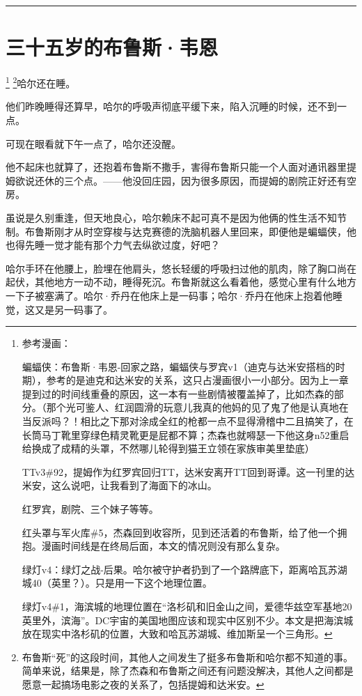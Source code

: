 \documentclass[../main]{subfiles}
\begin{document}
\begin{center}\rule{0.5\linewidth}{0.5pt}\end{center}

\section{三十五岁的布鲁斯·韦恩}

\footnote[1]{参考漫画：

    蝙蝠侠：布鲁斯·韦恩-回家之路，蝙蝠侠与罗宾v1（迪克与达米安搭档的时期），参考的是迪克和达米安的关系，这只占漫画很小一小部分。因为上一章提到过的时间线重叠的原因，这一本有一些剧情被覆盖掉了，比如杰森的部分。（那个光可鉴人、红润圆滑的玩意儿我真的他妈的见了鬼了他是认真地在当反派吗？！相比之下那对涂成全红的枪都一点不显得滑稽中二且搞笑了，在长筒马丁靴里穿绿色精灵靴更是屁都不算；杰森也就嘚瑟一下他这身n52重启给换成了成精的头罩，不然哪儿轮得到猫王立领在家族审美里垫底）

    TTv3\#92，提姆作为红罗宾回归TT，达米安离开TT回到哥谭。这一刊里的达米安，这么说吧，让我看到了海面下的冰山。

    红罗宾，剧院、三个妹子等等。

    红头罩与军火库\#5，杰森回到收容所，见到还活着的布鲁斯，给了他一个拥抱。漫画时间线是在终局后面，本文的情况则没有那么复杂。

    绿灯v4：绿灯之战-后果。哈尔被守护者扔到了一个路牌底下，距离哈瓦苏湖城40（英里？）。只是用一下这个地理位置。

    绿灯v4\#1，海滨城的地理位置在“洛杉矶和旧金山之间，爱德华兹空军基地20英里外，滨海”。DC宇宙的美国地图应该和现实中区别不少。本文是把海滨城放在现实中洛杉矶的位置，大致和哈瓦苏湖城、维加斯呈一个三角形。}
\footnote[2]{布鲁斯“死”的这段时间，其他人之间发生了挺多布鲁斯和哈尔都不知道的事。简单来说，结果是，除了杰森和布鲁斯之间还有问题没解决，其他人之间都是愿意一起搞场电影之夜的关系了，包括提姆和达米安。}哈尔还在睡。

他们昨晚睡得还算早，哈尔的呼吸声彻底平缓下来，陷入沉睡的时候，还不到一点。

可现在眼看就下午一点了，哈尔还没醒。

他不起床也就算了，还抱着布鲁斯不撒手，害得布鲁斯只能一个人面对通讯器里提姆欲说还休的三个点。——他没回庄园，因为很多原因，而提姆的剧院正好还有空房。

虽说是久别重逢，但天地良心，哈尔赖床不起可真不是因为他俩的性生活不知节制。布鲁斯刚才从时空穿梭与达克赛德的洗脑机器人里回来，即便他是蝙蝠侠，他也得先睡一觉才能有那个力气去纵欲过度，好吧？

哈尔手环在他腰上，脸埋在他肩头，悠长轻缓的呼吸扫过他的肌肉，除了胸口尚在起伏，其他地方一动不动，睡得死沉。布鲁斯就这么看着他，感觉心里有什么地方一下子被塞满了。哈尔·乔丹在他床上是一码事；哈尔·乔丹在他床上抱着他睡觉，这又是另一码事了。
\end{document}
